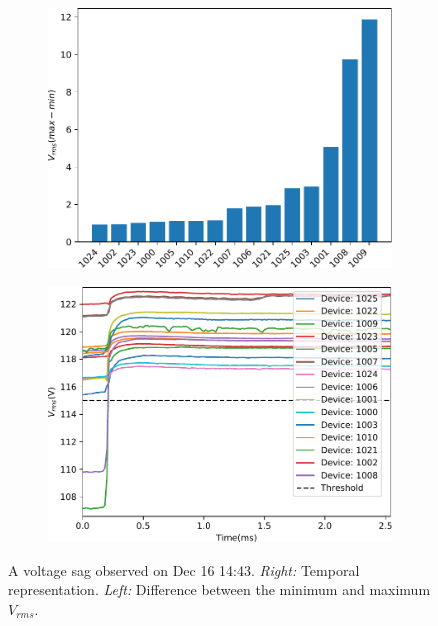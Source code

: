 \begin{figure}[ht!]
    \centering
    \begin{subfigure}{0.49\textwidth}
        \centering
        \includegraphics[width=1\linewidth]{img/napali_eval/subthreshold/clustering/411686.pdf}
    \end{subfigure}%
    \begin{subfigure}{0.49\textwidth}
        \centering
        \includegraphics[width=1\linewidth]{img/napali_eval/subthreshold/clustering/411686_data.pdf}
    \end{subfigure}
    \caption{
    A voltage sag observed on Dec 16 14:43.
    \textit{Right:} Temporal representation.
    \textit{Left:} Difference between the minimum and maximum $V_{rms}$.
    }
    \label{fig:expdes:sub:ev6}
\end{figure}

